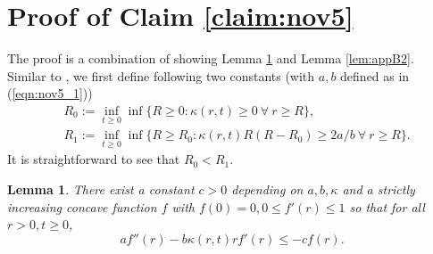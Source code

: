 \documentclass[11pt]{article}
\newtheorem{lemma}[theorem]{Lemma}
\newcommand{\1}{\mathds{1}}
\begin{document}
\section{Proof of Claim \ref{claim:nov5}}\label{sec:appendixb}
The proof is a combination of showing Lemma \ref{lem:appB1} and Lemma \ref{lem:appB2}. Similar to \cite{eberle2016reflection}, we first define following two constants (with $a, b$ defined as in (\ref{eqn:nov5_1}))
\begin{equation}
    \begin{aligned}
        &R_0 := \inf_{t\geq0}\inf \{R\geq 0: \kappa(r,t)\geq 0 ~\forall~ r\geq R\},\\
        &R_1 :=\inf_{t\geq0} \inf\{R\geq R_0: \kappa(r,t)R(R-R_0)\geq 2a/b ~\forall~ r\geq R\}.
    \end{aligned}
\end{equation}
It is straightforward to see that $R_0<R_1$.
\begin{lemma}\label{lem:appB1}
    There exist a constant $c>0$ depending on $a, b, \kappa$ and a strictly increasing concave function $f$ with $f(0)=0, 0\leq f'(r)\leq 1$ so that for all $r>0, t\geq0$,
  \begin{equation}\label{eqn:nov5_1}
        a f''(r)-b \kappa(r,t) r f'(r) \leq -cf(r).
    \end{equation}
\end{lemma}
\end{document}
